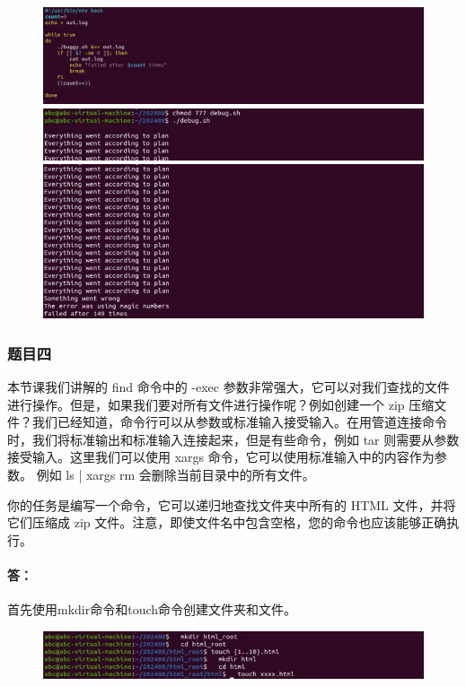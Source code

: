 \documentclass[a4paper, 12pt]{article}
\begin{document}
	\begin{figure}[H]
		\centering
		\includegraphics[width=1\textwidth]{010.jpg}
		\includegraphics[width=1\textwidth]{011.jpg}
		\includegraphics[width=1\textwidth]{012.jpg}
	\end{figure}
	
	\subsubsection{题目四}
	本节课我们讲解的 find 命令中的 -exec 参数非常强大，它可以对我们查找的文件进行操作。但是，如果我们要对所有文件进行操作呢？例如创建一个 zip 压缩文件？我们已经知道，命令行可以从参数或标准输入接受输入。在用管道连接命令时，我们将标准输出和标准输入连接起来，但是有些命令，例如 tar 则需要从参数接受输入。这里我们可以使用 xargs 命令，它可以使用标准输入中的内容作为参数。 例如 ls | xargs rm 会删除当前目录中的所有文件。
	
	你的任务是编写一个命令，它可以递归地查找文件夹中所有的 HTML 文件，并将它们压缩成 zip 文件。注意，即使文件名中包含空格，您的命令也应该能够正确执行。
	
	\paragraph{答：}
	首先使用mkdir命令和touch命令创建文件夹和文件。
	
	\begin{figure}[H]
		\centering
		\includegraphics[width=1\textwidth]{015.jpg}
	\end{figure}
	
\end{document}

